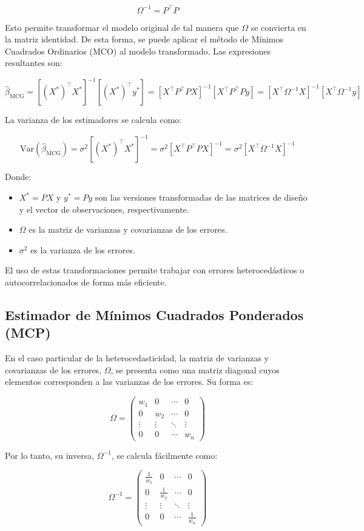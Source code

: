 \documentclass[a4paper,12pt]{article}
\begin{document}
\[
\Omega^{-1} = P^\top P
\]

Esto permite transformar el modelo original de tal manera que $\Omega$ se convierta en la matriz identidad. De esta forma, se puede aplicar el método de Mínimos Cuadrados Ordinarios (MCO) al modelo transformado. Las expresiones resultantes son:

\[
\hat{\beta}_{\text{MCG}} = [(X^*)^\top X^*]^{-1} [(X^*)^\top y^*] = [X^\top P^\top P X]^{-1} [X^\top P^\top P y] = [X^\top \Omega^{-1} X]^{-1} [X^\top \Omega^{-1} y]
\]

La varianza de los estimadores se calcula como:

\[
\text{Var}(\hat{\beta}_{\text{MCG}}) = \sigma^2 [(X^*)^\top X^*]^{-1} = \sigma^2 [X^\top P^\top P X]^{-1} = \sigma^2 [X^\top \Omega^{-1} X]^{-1}
\]

Donde:
\begin{itemize}
    \item $X^* = PX$ y $y^* = Py$ son las versiones transformadas de las matrices de diseño y el vector de observaciones, respectivamente.
    \item $\Omega$ es la matriz de varianzas y covarianzas de los errores.
    \item $\sigma^2$ es la varianza de los errores.
\end{itemize}

El uso de estas transformaciones permite trabajar con errores heterocedásticos o autocorrelacionados de forma más eficiente.

\subsection{Estimador de Mínimos Cuadrados Ponderados (MCP)}

En el caso particular de la heterocedasticidad, la matriz de varianzas y covarianzas de los errores, $\Omega$, se presenta como una matriz diagonal cuyos elementos corresponden a las varianzas de los errores. Su forma es:

\[
\Omega =
\begin{pmatrix}
w_1 & 0 & \cdots & 0 \\
0 & w_2 & \cdots & 0 \\
\vdots & \vdots & \ddots & \vdots \\
0 & 0 & \cdots & w_n
\end{pmatrix}
\]

Por lo tanto, su inversa, $\Omega^{-1}$, se calcula fácilmente como:

\[
\Omega^{-1} =
\begin{pmatrix}
\frac{1}{w_1} & 0 & \cdots & 0 \\
0 & \frac{1}{w_2} & \cdots & 0 \\
\vdots & \vdots & \ddots & \vdots \\
0 & 0 & \cdots & \frac{1}{w_n}
\end{pmatrix}
\]
\end{document}
